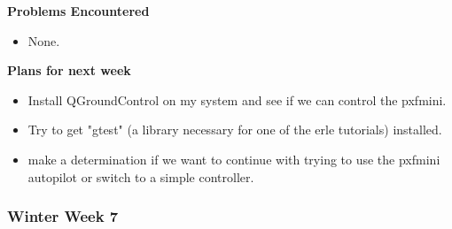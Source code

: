 \documentclass[compsoc,draftclsnofoot,onecolumn,10pt]{IEEEtran}
\begin{document}
\textbf{Problems Encountered}
\begin{itemize}
    \item None.
\end{itemize}

\textbf{Plans for next week}
\begin{itemize}
    \item Install QGroundControl on my system and see if we can control the pxfmini.
    \item Try to get "gtest" (a library necessary for one of the erle tutorials) installed.
    \item make a determination if we want to continue with trying to use the pxfmini autopilot or switch to a simple controller.
\end{itemize}


\subsubsection*{Winter Week 7}
\end{document}
